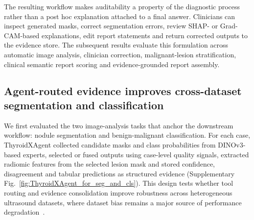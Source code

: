 \documentclass[fleqn,10pt]{wlscirep}
\begin{document}

The resulting workflow makes auditability a property of the diagnostic process rather than a post hoc explanation attached to a final answer. Clinicians can inspect generated masks, correct segmentation errors, review SHAP- or Grad-CAM-based explanations, edit report statements and return corrected outputs to the evidence store. The subsequent results evaluate this formulation across automatic image analysis, clinician correction, malignant-lesion stratification, clinical semantic report scoring and evidence-grounded report assembly.

\subsection{Agent-routed evidence improves cross-dataset segmentation and classification}

We first evaluated the two image-analysis tasks that anchor the downstream workflow: nodule segmentation and benign-malignant classification. For each case, ThyroidXAgent collected candidate masks and class probabilities from DINOv3-based experts, selected or fused outputs using case-level quality signals, extracted radiomic features from the selected lesion mask and stored confidence, disagreement and tabular predictions as structured evidence (Supplementary Fig.~\ref{fig:ThyroidXAgent_for_seg_and_cls}). This design tests whether tool routing and evidence consolidation improve robustness across heterogeneous ultrasound datasets, where dataset bias remains a major source of performance degradation~\cite{liu2024decade}.
\end{document}
